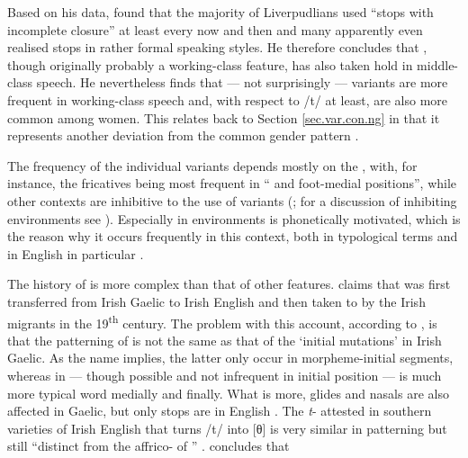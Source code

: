 Based on his \citeyear{knowles1973} data, \citeauthor{knowles1973} found that the majority of Liverpudlians used ``stops with incomplete closure'' at least every now and then and many apparently even realised  stops in rather formal speaking styles.
He therefore concludes that , though originally probably a working-class feature, has also taken hold in middle-class speech.
He nevertheless finds that --- not surprisingly ---  variants are more frequent in working-class speech and, with respect to /t/ at least, are also more common among women.
This relates back to Section \ref{sec.var.con.ng} in that it represents another deviation from the common gender pattern \citeyearpar[cf.][325--327]{knowles1973}.

The frequency of the individual variants depends mostly on the , with, for instance, the fricatives being most frequent in `` and foot-medial positions'', while other contexts are inhibitive to the use of  variants (\citealp[cf.][130]{honeybone2007}; for a discussion of inhibiting environments see \citealt{honeybone2001}).
Especially in  environments  is phonetically motivated, which is the reason why it occurs frequently in this context, both in typological terms and in  English in particular \parencite[cf.][230 and 243]{honeybone2001}.

The history of  is more complex than that of other features.
\textcite{hickey1996} claims that  was first transferred from Irish Gaelic to Irish English and then taken to  by the Irish migrants in the 19\textsuperscript{th} century.
The problem with this account, according to \citet{honeybone2007}, is that the patterning of   is not the same as that of the `initial mutations' in Irish Gaelic.
As the name implies, the latter only occur in morpheme-initial segments, whereas  in  --- though possible and not infrequent in initial position --- is much more typical word medially and finally.
What is more, glides and nasals are also affected in Gaelic, but only stops are  in  English \citep[cf.][131]{honeybone2007}.
The \emph{t}- attested in southern varieties of Irish English that turns /t/ into [θ] is very similar in patterning but still ``distinct from the affrico- of  '' \citep[132]{honeybone2007}.
\citeauthor{honeybone2007} concludes that

